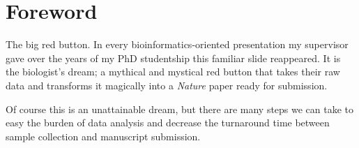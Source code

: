 \chapter*{Foreword}
\setlength\parindent{0pt}
\vspace{-1cm}
The big red button. In every bioinformatics-oriented presentation my supervisor gave over the years of my PhD studentship this familiar slide reappeared.
It is the biologist's dream; a mythical and mystical red button that takes their raw data and transforms it magically into a \emph{Nature} paper ready for submission.


Of course this is an unattainable dream, but there are many steps we can take to easy the burden of data analysis and decrease the
turnaround time between sample collection and manuscript submission. 
